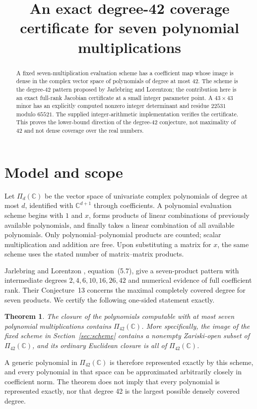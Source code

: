 \documentclass[11pt]{article}
\title{An exact degree-42 coverage certificate for seven polynomial multiplications}
\author{}
\date{}
\newtheorem{theorem}{Theorem}
\newcommand{\C}{\mathbb C}
\begin{document}
\maketitle
\begin{abstract}
A fixed seven-multiplication evaluation scheme has a coefficient map whose image is dense in the complex vector space of polynomials of degree at most 42. The scheme is the degree-42 pattern proposed by Jarlebring and Lorentzon; the contribution here is an exact full-rank Jacobian certificate at a small integer parameter point. A $43\times43$ minor has an explicitly computed nonzero integer determinant and residue $22531$ modulo $65521$. The supplied integer-arithmetic implementation verifies the certificate. This proves the lower-bound direction of the degree-42 conjecture, not maximality of 42 and not dense coverage over the real numbers.
\end{abstract}

\section{Model and scope}
Let $\Pi_d(\C)$ be the vector space of univariate complex polynomials of degree at most $d$, identified with $\C^{d+1}$ through coefficients. A polynomial evaluation scheme begins with $1$ and $x$, forms products of linear combinations of previously available polynomials, and finally takes a linear combination of all available polynomials. Only polynomial--polynomial products are counted; scalar multiplication and addition are free. Upon substituting a matrix for $x$, the same scheme uses the stated number of matrix--matrix products.

Jarlebring and Lorentzon \cite{JL}, equation~(5.7), give a seven-product pattern with intermediate degrees $2,4,6,10,16,26,42$ and numerical evidence of full coefficient rank. Their Conjecture~13 concerns the maximal completely covered degree for seven products. We certify the following one-sided statement exactly.

\begin{theorem}\label{thm:coverage}
The closure of the polynomials computable with at most seven polynomial multiplications contains $\Pi_{42}(\C)$. More specifically, the image of the fixed scheme in Section~\ref{sec:scheme} contains a nonempty Zariski-open subset of $\Pi_{42}(\C)$, and its ordinary Euclidean closure is all of $\Pi_{42}(\C)$.
\end{theorem}

A generic polynomial in $\Pi_{42}(\C)$ is therefore represented exactly by this scheme, and every polynomial in that space can be approximated arbitrarily closely in coefficient norm. The theorem does not imply that every polynomial is represented exactly, nor that degree 42 is the largest possible densely covered degree.
\end{document}
